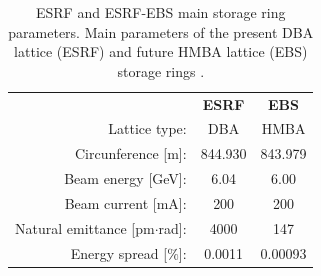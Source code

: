\documentclass{iucr}              %
\newcommand{\todo}[1]{{\color{red}[TODO: "#1'']}}
\begin{document}
\begin{table}\label{tab:TableSources}
    \caption{ESRF and ESRF-EBS main storage ring parameters. Main parameters of the present DBA lattice (ESRF) and future HMBA lattice (EBS) storage rings \cite{orangebook}.}
        \begin{tabular}{rcc}
                                              & \textbf{ESRF} & \textbf{EBS}      \\ 
        Lattice type:                         & DBA           & HMBA              \\
        Circunference {[}m{]}:                & 844.930       & 843.979           \\
        Beam energy {[}GeV{]}:                & 6.04          & 6.00              \\
        Beam current {[}mA{]}:                & 200           & 200               \\
        Natural emittance {[}pm$\cdot$rad{]}: & 4000          & 147               \\
        Energy spread {[}$\%${]}:             & 0.0011        & 0.00093           \\       
    \end{tabular}
\end{table}

\begin{table}\label{tab:eBeam}
    \centering
    \caption{ESRF and EBS main electron beam parameters. Electron beam parameters for the high-$\beta$ (ESRF) and the EBS straight sections. Values taken at the symmetry point of the straight section, where the insertion devices are placed. Values fir ESRF are taken from \cite{ESRF2014}. For EBS, two (very close) design values are used, from Ref.~\cite{ESRF2014} labelled EBS-S28A, and those coming from further lattice refinement, labelled EBS-S28D. \todo{Remove ESRF-AT?? Check again} }
\end{table}
\end{document}
